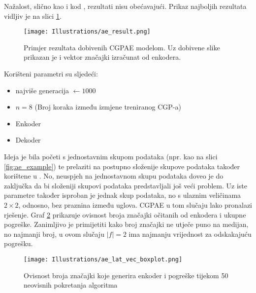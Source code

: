 Nažalost, slično kao i kod \cite{why_ae_diff}, rezultati nisu obećavajući.
Prikaz najboljih rezultata vidljiv je na slici \ref{fig:ae_results}.

\begin{figure}[H]
	\centering
	\texttt{[image: Illustrations/ae\_result.png]}
	\caption{Primjer rezultata dobivenih CGPAE modelom. Uz dobivene slike prikazan je i vektor značajki izračunat od enkodera.}
	\label{fig:ae_results}
\end{figure}

Korišteni parametri su sljedeći:
\begin{itemize}
	\item {najviše generacija $\leftarrow 1000$}
	\item {$n = 8$ (Broj koraka između izmjene treniranog CGP-a)}
	\item {Enkoder}
	\item {Dekoder}
\end{itemize}
Ideja je bila početi s jednostavnim skupom podataka (npr. kao na slici \ref{fig:ae_example}) te prelaziti na postupno složenije skupove podataka također korištene u \cite{why_ae_diff}.
No, neuspjeh na jednostavnom skupu podataka doveo je do zaključka da bi složeniji skupovi podataka predstavljali još veći problem.
Uz iste parametre također isproban je jednak skup podataka, no s ulaznim veličinama $2 \times 2$, odnosno, bez praznina između uglova.
CGPAE u tom slučaju lako pronalazi rješenje.
Graf \ref{fig:ae_boxplot} prikazuje ovisnost broja značajki očitanih od enkodera i ukupne pogreške.
Zanimljivo je primijetiti kako broj značajki ne utječe puno na medijan, no najmanji broj, u ovom slučaju $|f| = 2$ ima najmanju vrijednost za odskakajuću pogrešku.

\begin{figure}[H]
	\centering
	\texttt{[image: Illustrations/ae\_lat\_vec\_boxplot.png]}
	\caption{Ovisnost broja značajki koje generira enkoder i pogreške tijekom 50 neovisnih pokretanja algoritma}
	\label{fig:ae_boxplot}
\end{figure}
